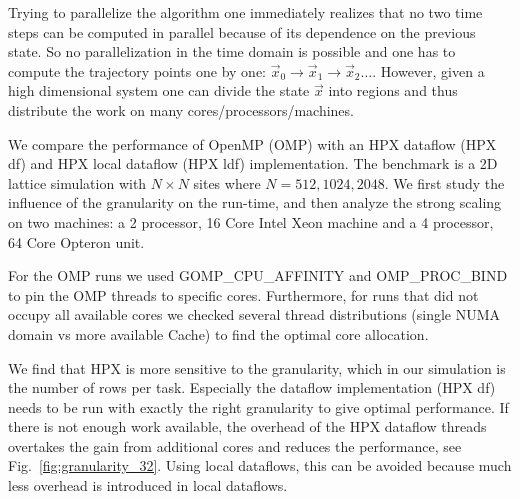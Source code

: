 \documentclass[a4wide,10pt]{scrartcl}
\begin{document}
Trying to parallelize the algorithm one immediately realizes that no two time steps can be computed in parallel because of its dependence on the previous state.
So no parallelization in the time domain is possible and one has to compute the trajectory points one by one: $\vec x_0\rightarrow\vec x_1 \rightarrow \vec x_2 \dots$.
However, given a high dimensional system one can divide the state $\vec x$ into regions and thus distribute the work on many cores/processors/machines.

We compare the performance of OpenMP (OMP) with an HPX dataflow (HPX df) and HPX local dataflow (HPX ldf) implementation.
The benchmark is a 2D lattice simulation with $N\times N$ sites where $N=512,1024,2048$.
We first study the influence of the granularity on the run-time, and then analyze the strong scaling on two machines: a 2 processor, 16 Core Intel Xeon machine and a 4 processor, 64 Core Opteron unit.

For the OMP runs we used GOMP\_CPU\_AFFINITY and OMP\_PROC\_BIND to pin the OMP threads to specific cores.
Furthermore, for runs that did not occupy all available cores we checked several thread distributions (single NUMA domain vs more available Cache) to find the optimal core allocation.

We find that HPX is more sensitive to the granularity, which in our simulation is the number of rows per task.
Especially the dataflow implementation (HPX df) needs to be run with exactly the right granularity to give optimal performance.
If there is not enough work available, the overhead of the HPX dataflow threads overtakes the gain from additional cores and reduces the performance, see Fig.~\ref{fig:granularity_32}.
Using local dataflows, this can be avoided because much less overhead is introduced in local dataflows.
\end{document}
